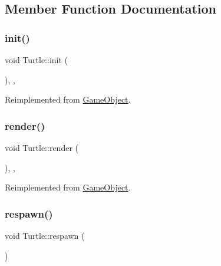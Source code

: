 \subsection{Member Function Documentation}
\mbox{\label{class_turtle_a6ba4b31af71ea52e0e885a3e3beb783c}} 
\subsubsection{\texorpdfstring{init()}{init()}}
{\footnotesize\ttfamily void Turtle\+::init (\begin{DoxyParamCaption}{ }\end{DoxyParamCaption})\hspace{0.3cm}{\ttfamily [inline]}, {\ttfamily [override]}, {\ttfamily [virtual]}}



Reimplemented from \hyperlink{class_game_object_aecb2c1b9f69715d854f7604d5d7978ec}{Game\+Object}.

\mbox{\label{class_turtle_a697924198490c52307fdb006f1df7456}} 
\subsubsection{\texorpdfstring{render()}{render()}}
{\footnotesize\ttfamily void Turtle\+::render (\begin{DoxyParamCaption}{ }\end{DoxyParamCaption})\hspace{0.3cm}{\ttfamily [inline]}, {\ttfamily [override]}, {\ttfamily [virtual]}}



Reimplemented from \hyperlink{class_game_object_a484efb66a7a27c101e84c11d9905d7a6}{Game\+Object}.

\mbox{\label{class_turtle_a6c70cb2158f173b82df6620905ad435c}} 
\subsubsection{\texorpdfstring{respawn()}{respawn()}}
{\footnotesize\ttfamily void Turtle\+::respawn (\begin{DoxyParamCaption}{ }\end{DoxyParamCaption})\hspace{0.3cm}{\ttfamily [inline]}}


